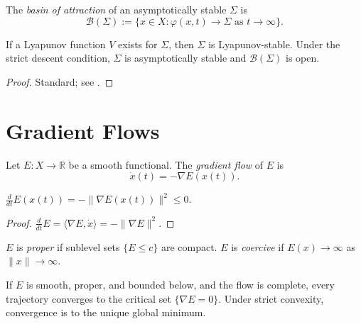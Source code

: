 \documentclass[11pt,openany]{book}
\begin{document}
\begin{definition}
The \emph{basin of attraction} of an asymptotically stable
$\Sigma$ is
\[
  \mathcal{B}(\Sigma) := \{x \in X :
    \varphi(x,t) \to \Sigma \text{ as } t \to \infty\}.
\]
\end{definition}

\begin{theorem}
\label{thm:lyapunov-main}
If a Lyapunov function $V$ exists for $\Sigma$, then
$\Sigma$ is Lyapunov-stable.  Under the strict descent
condition, $\Sigma$ is asymptotically stable and
$\mathcal{B}(\Sigma)$ is open.
\end{theorem}

\begin{proof}
Standard; see \citet{strogatz2015nonlinear}.
\end{proof}

\section{Gradient Flows}
\label{sec:gradient-flows}

\begin{definition}
Let $E : X \to \mathbb{R}$ be a smooth functional.  The
\emph{gradient flow} of $E$ is
\[
  \dot{x}(t) = -\nabla E(x(t)).
\]
\end{definition}

\begin{proposition}
\label{prop:energy-descent-app}
$\frac{d}{dt} E(x(t)) = -\|\nabla E(x(t))\|^2 \le 0$.
\end{proposition}

\begin{proof}
$\frac{d}{dt}E = \langle \nabla E, \dot x\rangle =
-\|\nabla E\|^2$.
\end{proof}

\begin{definition}
$E$ is \emph{proper} if sublevel sets $\{E \le c\}$ are
compact.  $E$ is \emph{coercive} if $E(x) \to \infty$ as
$\|x\| \to \infty$.
\end{definition}

\begin{theorem}
\label{thm:gradient-convergence}
If $E$ is smooth, proper, and bounded below, and the flow
is complete, every trajectory converges to the critical
set $\{\nabla E = 0\}$.  Under strict convexity,
convergence is to the unique global minimum.
\end{theorem}
\end{document}
